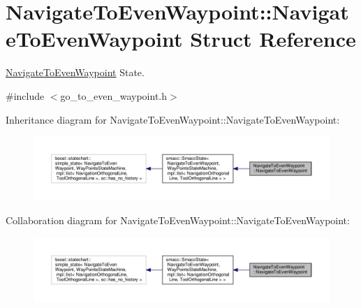 \hypertarget{structNavigateToEvenWaypoint_1_1NavigateToEvenWaypoint}{\section{Navigate\-To\-Even\-Waypoint\-:\-:Navigate\-To\-Even\-Waypoint Struct Reference}
\label{structNavigateToEvenWaypoint_1_1NavigateToEvenWaypoint}
}


\hyperlink{structNavigateToEvenWaypoint_1_1NavigateToEvenWaypoint}{Navigate\-To\-Even\-Waypoint} State.  




{\ttfamily \#include $<$go\-\_\-to\-\_\-even\-\_\-waypoint.\-h$>$}



Inheritance diagram for Navigate\-To\-Even\-Waypoint\-:\-:Navigate\-To\-Even\-Waypoint\-:
\nopagebreak
\begin{figure}[H]
\begin{center}
\leavevmode
\includegraphics[width=350pt]{structNavigateToEvenWaypoint_1_1NavigateToEvenWaypoint__inherit__graph}
\end{center}
\end{figure}


Collaboration diagram for Navigate\-To\-Even\-Waypoint\-:\-:Navigate\-To\-Even\-Waypoint\-:
\nopagebreak
\begin{figure}[H]
\begin{center}
\leavevmode
\includegraphics[width=350pt]{structNavigateToEvenWaypoint_1_1NavigateToEvenWaypoint__coll__graph}
\end{center}
\end{figure}
